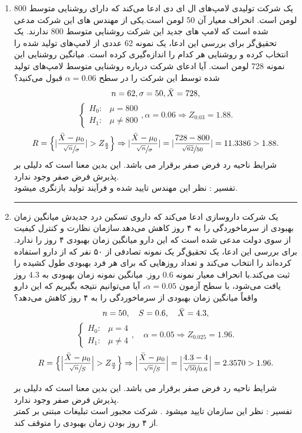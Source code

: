 \documentclass[persian]{KNED}
\begin{document}
\begin{solution}

\begin{enumerate}
    \item یک شرکت تولیدی لامپ‌های ال ای دی ادعا می‌کند که دارای روشنایی متوسط 800 لومن است. انحراف معیار آن 50 لومن است.یکی از مهندس های این شرکت مدعی شده است که لامپ های جدید این شرکت روشنایی متوسط 800 ندارند. یک تحقیق‌گر برای بررسی این ادعا، یک نمونه 62 عددی از لامپ‌های تولید شده را انتخاب کرده و روشنایی هر کدام را اندازه‌گیری کرده است. میانگین روشنایی این نمونه 728 لومن است. آیا ادعای شرکت درباره روشنایی متوسط لامپ‌های تولید شده توسط این شرکت را در سطح $\alpha = 0.06$ قبول می‌کنید؟\\
    \[ n = 62,
    \sigma = 50,
    \Bar{X} = 728,
    \]
    \[
\begin{cases}
    H_0: & \mu = 800 \\
    H_1: & \mu \neq 800
\end{cases}, \alpha = 0.06 \Rightarrow Z_{0.03} = 1.88.
\]
\[
R = \Big\{  \vert \frac{\Bar{X} - \mu_0}{\sfrac{\sqrt{n}}{\sigma}}\vert  > Z_{\frac{a}{2}} \Big\} \Rightarrow \vert \frac{\Bar{X} - \mu_0}{\sfrac{\sqrt{n}}{\sigma}} \vert = \vert \frac{728 - 800}{\sfrac{\sqrt{62}}{50}} \vert = 11.3386 > 1.88.
    \]
    شرایط ناحیه رد فرض صفر برقرار می باشد. این بدین معنا است که دلیلی بر پذیرش فرض صفر
وجود ندارد.\\
تفسیر : نظر این مهندس تایید شده و فرآیند تولید بازنگری میشود.\\
\rule{\linewidth}{1pt}
\item یک شرکت داروسازی ادعا می‌کند که داروی تسکین درد جدیدش میانگین زمان بهبودی از سرماخوردگی را به ۴ روز کاهش می‌دهد.سازمان نظارت و کنترل کیفیت از سوی دولت مدعی شده است که این دارو میانگین زمان بهبودی ۴ روز را ندارد. برای بررسی این ادعا، یک تحقیق‌گر یک نمونه تصادفی از ۵۰ نفر که از دارو استفاده کرده‌اند را انتخاب می‌کند و تعداد روزهایی که برای هر فرد بهبودی طول کشیده را ثبت می‌کند.با انحراف معیار نمونه $0.6$ روز. میانگین نمونه زمان بهبودی به $4.3$ روز یافت می‌شود، با سطح آزمون $\alpha = 0.05$، آیا می‌توانیم نتیجه بگیریم که این دارو واقعاً میانگین زمان بهبودی از سرماخوردگی را به ۴ روز کاهش می‌دهد؟
\[
n = 50, \quad
S = 0.6, \quad
\Bar{X} = 4.3,
\]
\[
\begin{cases}
    H_0: & \mu = 4 \\
    H_1: & \mu \neq 4
\end{cases}, \quad
\alpha = 0.05 \Rightarrow Z_{0.025} = 1.96.
\]
\[
R = \Big\{  \Big\vert \frac{\Bar{X} - \mu_0}{\sfrac{\sqrt{n}}{S}} \Big\vert  > Z_{\frac{\alpha}{2}} \Big\} \Rightarrow \Big\vert \frac{\Bar{X} - \mu_0}{\sfrac{\sqrt{n}}{S}} \Big\vert = \Big\vert \frac{4.3 - 4}{\sfrac{\sqrt{50}}{0.6}} \Big\vert =  2.3570 > 1.96.
\]

    شرایط ناحیه رد فرض صفر برقرار می باشد. این بدین معنا است که دلیلی بر پذیرش فرض صفر
وجود ندارد.\\
تفسیر : نظر این سازمان تایید میشود . شرکت مجبور است تبلیغات مبتنی بر کمتر از ۴ روز بودن زمان بهبودی را متوقف کند.\\

\end{enumerate}
\end{solution}
\end{document}
